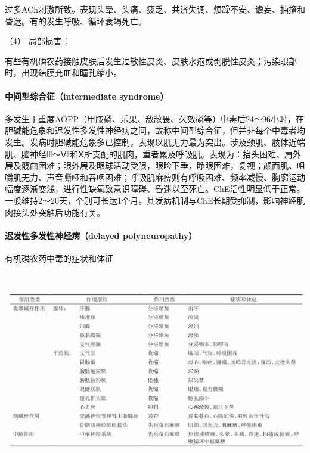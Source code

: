 过多ACh刺激所致。表现头晕、头痛、疲乏、共济失调、烦躁不安、谵妄、抽搐和昏迷。有的发生呼吸、循环衰竭死亡。

\hypertarget{text00139.htmlux5cux23CHP5-3-1-2-2-1-4}{}
（4） 局部损害：

有些有机磷农药接触皮肤后发生过敏性皮炎、皮肤水疱或剥脱性皮炎；污染眼部时，出现结膜充血和瞳孔缩小。

\paragraph{中间型综合征（intermediate syndrome）}

多发生于重度AOPP（甲胺磷、乐果、敌敌畏、久效磷等）中毒后24～96小时，在胆碱能危象和迟发性多发性神经病之间，故称中间型综合征，但并非每个中毒者均发生。发病时胆碱能危象多已控制，表现以肌无力最为突出。涉及颈肌、肢体近端肌、脑神经Ⅲ～Ⅶ和Ⅹ所支配的肌肉，重者累及呼吸肌。表现为：抬头困难、肩外展及髋曲困难；眼外展及眼球活动受限，眼睑下垂，睁眼困难，复视；颜面肌、咀嚼肌无力、声音嘶哑和吞咽困难；呼吸肌麻痹则有呼吸困难、频率减慢、胸廓运动幅度逐渐变浅，进行性缺氧致意识障碍、昏迷以至死亡。ChE活性明显低于正常。一般维持2～20天，个别可长达1个月。其发病机制与ChE长期受抑制，影响神经肌肉接头处突触后功能有关。

\paragraph{迟发性多发性神经病（delayed polyneuropathy）}

\begin{table}[htbp]
\centering
\caption{有机磷农药中毒的症状和体征}
\label{tab55-2}
\includegraphics[width=6.61458in,height=3.41667in]{./images/Image00203.jpg}
\end{table}

